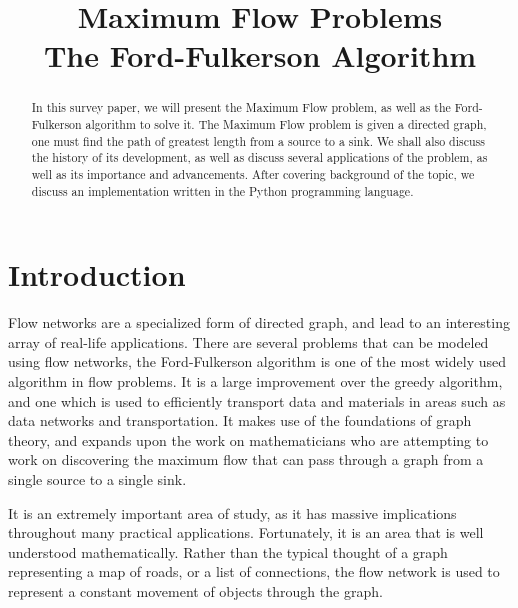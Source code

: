 \documentclass[conference]{IEEEtran}
\begin{document}
%
\title{Maximum Flow Problems\\The Ford-Fulkerson Algorithm}


\author{
}

\maketitle

\begin{abstract}
In this survey paper, we will present the Maximum Flow problem, as well as the Ford-Fulkerson algorithm to solve it. The Maximum Flow problem is given a directed graph, one must find the path of greatest length from a source to a sink. We shall also discuss the history of its development, as well as discuss several applications of the problem, as well as its importance and advancements. After covering background of the topic, we discuss an implementation written in the Python programming language.
\end{abstract}

\IEEEpeerreviewmaketitle

\section{Introduction}
Flow networks are a specialized form of directed graph, and lead to an interesting array of real-life applications. There are several problems that can be modeled using flow networks, the Ford-Fulkerson algorithm is one of the most widely used algorithm in flow problems. It is a large improvement over the greedy algorithm, and one which is used to efficiently transport data and materials in areas such as data networks and transportation. It makes use of the foundations of graph theory, and expands upon the work on mathematicians who are attempting to work on discovering the maximum flow that can pass through a graph from a single source to a single sink.

It is an extremely important area of study, as it has massive implications throughout many practical applications. Fortunately, it is an area that is well understood mathematically. Rather than the typical thought of a graph representing a map of roads, or a list of connections, the flow network is used to represent a constant movement of objects through the graph. 
\end{document}
